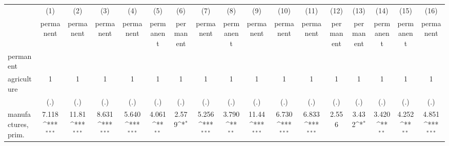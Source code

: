 {
\def\sym#1{\ifmmode^{#1}\else\(^{#1}\)\fi}
\begin{tabular}{l*{16}{c}}
\hline\hline
                    &\multicolumn{1}{c}{(1)}&\multicolumn{1}{c}{(2)}&\multicolumn{1}{c}{(3)}&\multicolumn{1}{c}{(4)}&\multicolumn{1}{c}{(5)}&\multicolumn{1}{c}{(6)}&\multicolumn{1}{c}{(7)}&\multicolumn{1}{c}{(8)}&\multicolumn{1}{c}{(9)}&\multicolumn{1}{c}{(10)}&\multicolumn{1}{c}{(11)}&\multicolumn{1}{c}{(12)}&\multicolumn{1}{c}{(13)}&\multicolumn{1}{c}{(14)}&\multicolumn{1}{c}{(15)}&\multicolumn{1}{c}{(16)}\\
                    &\multicolumn{1}{c}{permanent}&\multicolumn{1}{c}{permanent}&\multicolumn{1}{c}{permanent}&\multicolumn{1}{c}{permanent}&\multicolumn{1}{c}{permanent}&\multicolumn{1}{c}{permanent}&\multicolumn{1}{c}{permanent}&\multicolumn{1}{c}{permanent}&\multicolumn{1}{c}{permanent}&\multicolumn{1}{c}{permanent}&\multicolumn{1}{c}{permanent}&\multicolumn{1}{c}{permanent}&\multicolumn{1}{c}{permanent}&\multicolumn{1}{c}{permanent}&\multicolumn{1}{c}{permanent}&\multicolumn{1}{c}{permanent}\\
\hline
permanent           &                     &                     &                     &                     &                     &                     &                     &                     &                     &                     &                     &                     &                     &                     &                     &                     \\
agriculture         &           1         &           1         &           1         &           1         &           1         &           1         &           1         &           1         &           1         &           1         &           1         &           1         &           1         &           1         &           1         &           1         \\
                    &         (.)         &         (.)         &         (.)         &         (.)         &         (.)         &         (.)         &         (.)         &         (.)         &         (.)         &         (.)         &         (.)         &         (.)         &         (.)         &         (.)         &         (.)         &         (.)         \\
[1em]
manufactures, prim. &       7.118\sym{***}&       11.81\sym{***}&       8.631\sym{***}&       5.640\sym{***}&       4.061\sym{**} &       2.579\sym{*}  &       5.256\sym{***}&       3.790\sym{**} &       11.44\sym{***}&       6.730\sym{***}&       6.833\sym{***}&       2.556         &       3.432\sym{*}  &       3.420\sym{**} &       4.252\sym{**} &       4.851\sym{***}\\

\end{tabular}}
